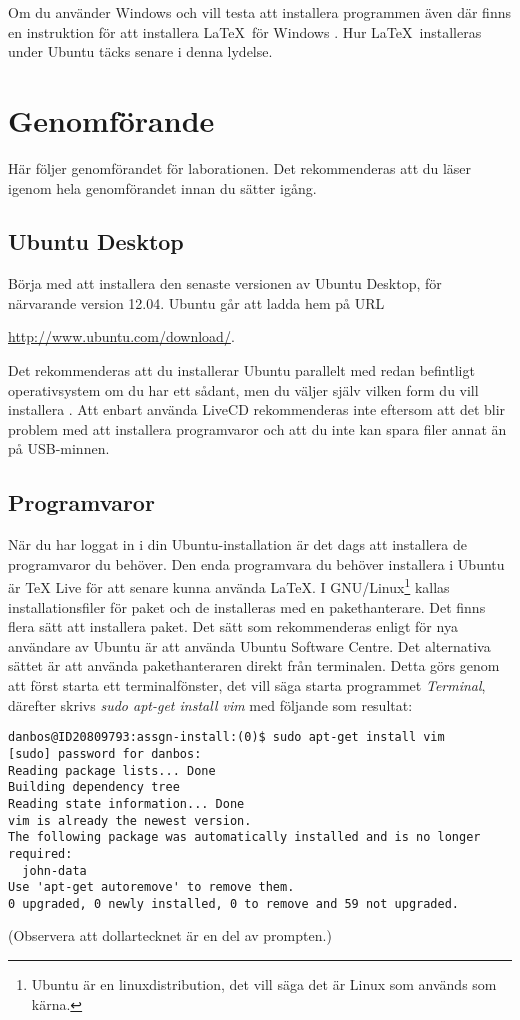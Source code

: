 \documentclass[11pt,a4paper]{miunasgn}
\begin{document}
Om du använder Windows och vill testa att installera programmen även där finns 
en instruktion för att installera \LaTeX\ för Windows \citep{Bosk2012lui}.
Hur \LaTeX\ installeras under Ubuntu täcks senare i denna lydelse.


\section{Genomförande}
\label{sec:Genomforande}
\noindent
Här följer genomförandet för laborationen.
Det rekommenderas att du läser igenom hela genomförandet innan du sätter igång.

\subsection{Ubuntu Desktop}
\noindent
Börja med att installera den senaste versionen av Ubuntu Desktop, för 
närvarande version 12.04.
Ubuntu går att ladda hem på URL
\begin{center}
	\url{http://www.ubuntu.com/download/}.
\end{center}
Det rekommenderas att du installerar Ubuntu parallelt med redan befintligt 
operativsystem om du har ett sådant, men du väljer själv vilken form du vill 
installera \citep[för detaljer, se][]{UbuntuInstall}.
Att enbart använda LiveCD rekommenderas inte eftersom att det blir problem med 
att installera programvaror och att du inte kan spara filer annat än på 
USB-minnen.

\subsection{Programvaror}
\noindent
När du har loggat in i din Ubuntu-installation är det dags att installera de 
programvaror du behöver.
Den enda programvara du behöver installera i Ubuntu är TeX Live för att senare 
kunna använda \LaTeX.
I GNU/Linux\footnote{%
	Ubuntu är en linuxdistribution, det vill säga det är Linux som används som 
	kärna.
} kallas installationsfiler för paket och de installeras med en pakethanterare.
Det finns flera sätt att installera paket.
Det sätt som rekommenderas enligt \citet{UbuntuDesktop} för nya användare av 
Ubuntu är att använda Ubuntu Software Centre.
Det alternativa sättet är att använda pakethanteraren direkt från terminalen.
Detta görs genom att först starta ett terminalfönster, det vill säga starta 
programmet \emph{Terminal}, därefter skrivs \emph{sudo apt-get install vim} med 
följande som resultat:
\begin{lstlisting}
danbos@ID20809793:assgn-install:(0)$ sudo apt-get install vim
[sudo] password for danbos: 
Reading package lists... Done
Building dependency tree       
Reading state information... Done
vim is already the newest version.
The following package was automatically installed and is no longer required:
  john-data
Use 'apt-get autoremove' to remove them.
0 upgraded, 0 newly installed, 0 to remove and 59 not upgraded.
\end{lstlisting}
(Observera att dollartecknet är en del av prompten.)
\end{document}
